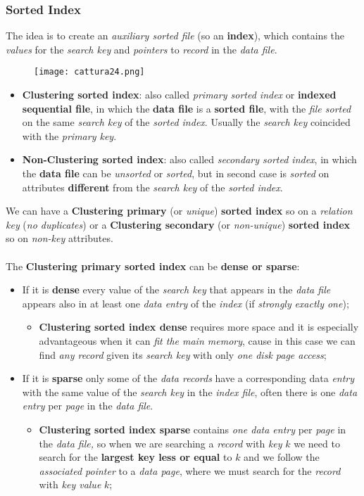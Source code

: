 \documentclass{article}
\begin{document}
\subsubsection{Sorted Index}
The idea is to create an \emph{auxiliary sorted file} (so an \textbf{index}), which contains the \emph{values} for the \emph{search key} and \emph{pointers} to \emph{record} in the \emph{data file}. 
\begin{figure}[H]
  \centering
  \texttt{[image: cattura24.png]}
\end{figure}
\begin{itemize}
\item \textbf{Clustering sorted index}: also called \emph{primary sorted index} or \textbf{indexed sequential file}, in which the \textbf{data file} is a \textbf{sorted file}, with the \emph{file sorted} on the same \emph{search key} of the \emph{sorted index}. Usually the \emph{search key} coincided with the \emph{primary key}.
\item \textbf{Non-Clustering sorted index}: also called \emph{secondary sorted index}, in which the \textbf{data file} can be \emph{unsorted} or \emph{sorted}, but in second case is \emph{sorted} on attributes \textbf{different} from the \emph{search key} of the \emph{sorted index}. 
\end{itemize}
We can have a \textbf{Clustering primary} (or \emph{unique}) \textbf{sorted index} so on a \emph{relation key} (\emph{no duplicates}) or a \textbf{Clustering secondary} (or \emph{non-unique}) \textbf{sorted index} so on \emph{non-key} attributes. \\\\
The \textbf{Clustering primary sorted index} can be \textbf{dense or sparse}:
\begin{itemize}
\item If it is \textbf{dense} every value of the \emph{search key} that appears in the \emph{data file} appears also in at least one \emph{data entry} of the \emph{index} (if \emph{strongly} \emph{exactly one});
\begin{itemize}
\item \textbf{Clustering sorted index dense} requires more space and it is especially advantageous when it can \emph{fit the main memory}, cause in this case we can find \emph{any record} given its \emph{search key} with only \emph{one disk page access}; 
\end{itemize}
\item If it is \textbf{sparse} only some of the \emph{data records} have a corresponding data \emph{entry} with the same value of the \emph{search key} in the \emph{index file}, often there is one \emph{data entry} per \emph{page} in the \emph{data file}. 
\begin{itemize}
\item \textbf{Clustering sorted index sparse} contains \emph{one data entry} per \emph{page} in the \emph{data file,} so when we are searching a \emph{record} with \emph{key} $k$ we need to search for the \textbf{largest key less or equal} to $k$ and we follow the \emph{associated pointer} to a \emph{data page}, where we must search for the \emph{record} with \emph{key value} $k$;
\end{itemize}
\end{itemize}
\end{document}
